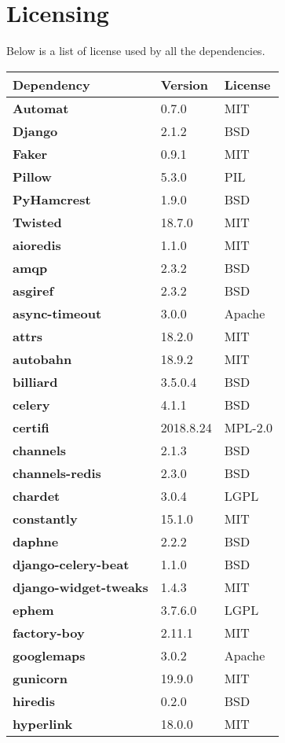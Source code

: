 \section{Licensing}
Below is a list of license used by all the dependencies.
\begin{longtable}{| p{} | p{} | p{} |}
\hline
\textbf{Dependency} & \textbf{Version} & \textbf{License} \\ \hline
\textbf{Automat} & 0.7.0 & MIT \\
\textbf{Django} & 2.1.2 & BSD \\
\textbf{Faker} & 0.9.1 & MIT \\
\textbf{Pillow} & 5.3.0 & PIL \\
\textbf{PyHamcrest} & 1.9.0 & BSD \\
\textbf{Twisted} & 18.7.0 & MIT \\
\textbf{aioredis} & 1.1.0 & MIT \\
\textbf{amqp} & 2.3.2 & BSD \\
\textbf{asgiref} & 2.3.2 & BSD \\
\textbf{async-timeout} & 3.0.0 & Apache \\
\textbf{attrs} & 18.2.0 & MIT \\
\textbf{autobahn} & 18.9.2 & MIT \\
\textbf{billiard} & 3.5.0.4 & BSD \\
\textbf{celery} & 4.1.1 & BSD \\
\textbf{certifi} & 2018.8.24 & MPL-2.0 \\
\textbf{channels} & 2.1.3 & BSD \\
\textbf{channels-redis} & 2.3.0 & BSD \\
\textbf{chardet} & 3.0.4 & LGPL \\
\textbf{constantly} & 15.1.0 & MIT \\
\textbf{daphne} & 2.2.2 & BSD \\
\textbf{django-celery-beat} & 1.1.0 & BSD \\
\textbf{django-widget-tweaks} & 1.4.3 & MIT \\
\textbf{ephem} & 3.7.6.0 & LGPL \\
\textbf{factory-boy} & 2.11.1 & MIT \\
\textbf{googlemaps} & 3.0.2 & Apache \\
\textbf{gunicorn} & 19.9.0 & MIT \\
\textbf{hiredis} & 0.2.0 & BSD \\
\textbf{hyperlink} & 18.0.0 & MIT \\

\end{longtable}

